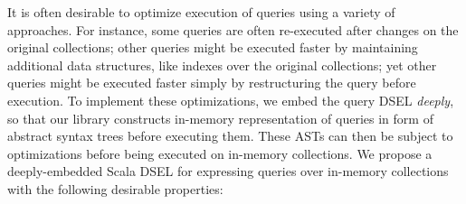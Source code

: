 \documentclass[preprint,authoryear,10pt]{sigplanconf}
\begin{document}

It is often desirable to optimize execution of queries using a variety
of approaches. For instance, some queries are often re-executed after
changes on the original collections; other queries might be executed
faster by maintaining additional data structures, like indexes over the
original collections; yet other queries might be executed faster simply
by restructuring the query before execution. To implement these
optimizations, we embed the query DSEL \emph{deeply}, so that our
library constructs in-memory representation of queries in form of
abstract syntax trees before executing them. These ASTs can then be
subject to optimizations before being executed on in-memory collections.
We propose a deeply-embedded Scala DSEL for expressing queries over
in-memory collections with the following desirable properties:
\end{document}
